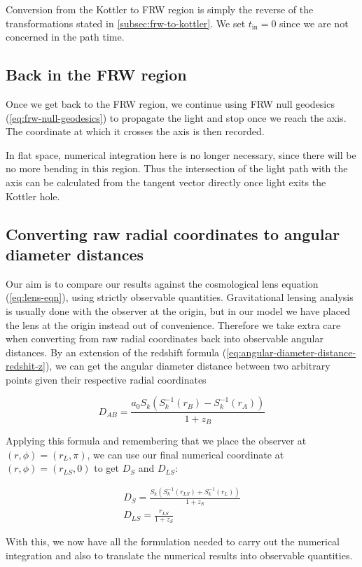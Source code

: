 Conversion from the Kottler to FRW region is simply the reverse of the transformations stated in \autoref{subsec:frw-to-kottler}. We set $t_{\text{in}} = 0$ since we are not concerned in the path time. 

\subsection{Back in the FRW region}

Once we get back to the FRW region, we continue using FRW null geodesics (\autoref{eq:frw-null-geodesics}) to propagate the light and stop once we reach the axis. The coordinate at which it crosses the axis is then recorded. 

In flat space, numerical integration here is no longer necessary, since there will be no more bending in this region. Thus the intersection of the light path with the axis can be calculated from the tangent vector directly once light exits the Kottler hole. 

\subsection{Converting raw radial coordinates to angular diameter distances}

Our aim is to compare our results against the cosmological lens equation (\autoref{eq:lens-eqn}), using strictly observable quantities. Gravitational lensing analysis is usually done with the observer at the origin, but in our model we have placed the lens at the origin instead out of convenience. Therefore we take extra care when converting from raw radial coordinates back into observable angular distances. By an extension of the redshift formula (\autoref{eq:angular-diameter-distance-redshit-z}), we can get the angular diameter distance between two arbitrary points given their respective radial coordinates \citep{peacock1999cosmological}

\begin{equation}
  D_{AB} = \frac{a_0  S_k(S_k^{-1}(r_B) - S_k^{-1}(r_A))}{1+z_B}
\end{equation}

Applying this formula and remembering that we place the observer at $(r, \phi) = (r_L, \pi)$, we can use our final numerical coordinate at $(r, \phi) = (r_{LS}, 0)$ to get $D_S$ and $D_{LS}$:

\begin{subequations}
  \begin{gather}
    D_{S} = \frac{S_k(S_k^{-1}(r_{LS}) + S_k^{-1}(r_L))}{1+z_S}\\
    D_{LS} = \frac{r_{LS}}{1+z_S}
  \end{gather}
\end{subequations}

With this, we now have all the formulation needed to carry out the numerical integration and also to translate the numerical results into observable quantities. 
